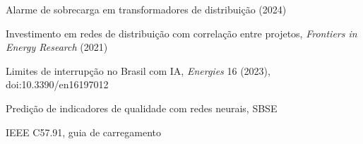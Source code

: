 {\begin{enumerate}[label={[\arabic*]},leftmargin=2.2em,itemsep=1pt]
\item Alarme de sobrecarga em transformadores de distribuição (2024)
\item Investimento em redes de distribuição com correlação entre projetos, \emph{Frontiers in Energy Research} (2021)
\item Limites de interrupção no Brasil com IA, \emph{Energies} 16 (2023), doi:10.3390/en16197012
\item Predição de indicadores de qualidade com redes neurais, SBSE
\item IEEE C57.91, guia de carregamento
\end{enumerate}}
